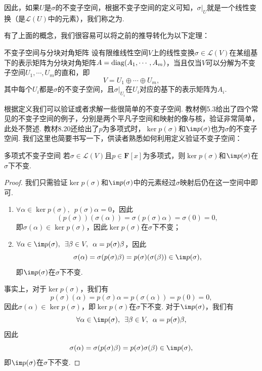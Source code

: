 因此，如果$U$是$\sigma$的不变子空间，根据不变子空间的定义可知，$\sigma\vert_U$就是一个线性变换（是$\mathcal{L}(U)$中的元素），我们称之为.

有了上面的概念，我们很容易可以将之前的推导转化为以下定理：
\begin{theorem}{}{不变子空间与分块对角矩阵}
    设有限维线性空间$V$上的线性变换$\sigma\in\mathcal{L}(V)$在某组基下的表示矩阵为分块对角矩阵$A=\operatorname{diag}(A_1,\cdots,A_m)$，当且仅当$V$可以分解为不变子空间$U_1,\cdots,U_m$的直和，即
    \[V=U_1\oplus\cdots\oplus U_m,\]
    其中每个$U_i$都是$\sigma$的不变子空间，且$\sigma\vert_{U_i}$在$U_i$对应的基下的表示矩阵为$A_i$.
\end{theorem}

根据定义我们可以验证或者求解一些很简单的不变子空间. 教材例5.3给出了四个常见的不变子空间的例子，分别是两个平凡子空间和映射的像与核，验证非常简单，此处不赘述. 教材8.20还给出了$p$为多项式时，$\ker p(\sigma)$和$\im p(\sigma)$也为$\sigma$的不变子空间. 我们这里也简要书写一下，供读者熟悉如何利用定义验证不变子空间：
\begin{example}{}{多项式不变子空间}
    若$\sigma\in\mathcal{L}(V)$且$p\in\mathbf{F}[x]$为多项式，则$\ker p(\sigma)$和$\im p(\sigma)$在$\sigma$下不变.
\end{example}

\begin{proof}
    我们只需验证$\ker p(\sigma)$和$\im p(\sigma)$中的元素经过$\sigma$映射后仍在这一空间中即可.
    \begin{enumerate}
        \item $\forall \alpha\in \ker p(\sigma),\enspace p(\sigma)\alpha=0$，因此
              \[(p(\sigma))(\sigma(\alpha))=\sigma(p(\sigma)\alpha)=\sigma(0)=0,\]
              即$\sigma(\alpha)\in \ker p(\sigma)$，因此$\ker p(\sigma)$在$\sigma$下不变；

        \item $\forall \alpha\in \im p(\sigma),\enspace \exists \beta\in V,\enspace \alpha=p(\sigma)\beta$，因此
              \[\sigma(\alpha)=\sigma(p(\sigma)\beta)=p(\sigma)(\sigma(\beta))\in \im p(\sigma),\]
              即$\im p(\sigma)$在$\sigma$下不变.
    \end{enumerate}
    事实上，对于$\ker p(\sigma)$，我们有
    \[ p(\sigma)(\alpha)=p(\sigma)\alpha=p(\sigma(\alpha))=p(0)=0,\]
    因此$\sigma(\alpha)\in \ker p(\sigma)$，即$\ker p(\sigma)$在$\sigma$下不变. 对于$\im p(\sigma)$，我们有
    \[\forall \alpha\in \im p(\sigma),\enspace \exists \beta\in V,\enspace \alpha=p(\sigma)\beta,\]
    因此
    \[\sigma(\alpha)=\sigma(p(\sigma)\beta)=p(\sigma)\sigma(\beta)\in \im p(\sigma),\]
    即$\im p(\sigma)$在$\sigma$下不变.
\end{proof}

